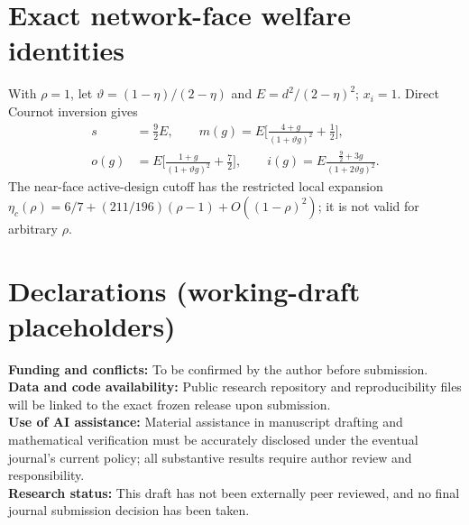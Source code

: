 \documentclass[11pt,a4paper]{article}
\theoremstyle{remark}\newtheorem{remark}[theorem]{Remark}
\begin{document}
\section{Exact network-face welfare identities}\label{app:network}
With $\rho=1$, let $\vartheta=(1-\eta)/(2-\eta)$ and $E=d^2/(2-\eta)^2$; $x_i=1$. Direct Cournot inversion gives
\begin{equation}\label{eq:face}
\begin{split}
s&=\tfrac92 E,\qquad
m(g)=E\biggl[\frac{4+g}{(1+\vartheta g)^2}+\tfrac12\biggr],\\
o(g)&=E\biggl[\frac{1+g}{(1+\vartheta g)^2}+\tfrac72\biggr],\qquad
i(g)=E\frac{\tfrac92+3g}{(1+2\vartheta g)^2}.
\end{split}
\end{equation}
The near-face active-design cutoff has the restricted local expansion $\eta_c(\rho)=6/7+(211/196)(\rho-1)+O((1-\rho)^2)$; it is not valid for arbitrary $\rho$.



\section*{Declarations (working-draft placeholders)}
\noindent\textbf{Funding and conflicts:} To be confirmed by the author before submission.\\
\textbf{Data and code availability:} Public research repository and reproducibility files will be linked to the exact frozen release upon submission.\\
\textbf{Use of AI assistance:} Material assistance in manuscript drafting and mathematical verification must be accurately disclosed under the eventual journal's current policy; all substantive results require author review and responsibility.\\
\textbf{Research status:} This draft has not been externally peer reviewed, and no final journal submission decision has been taken.
\end{document}
